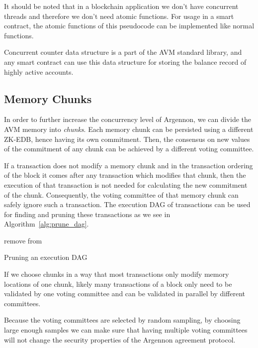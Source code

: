 It should be noted that in a blockchain application we don't have concurrent threads and therefore we don't need
atomic functions. For usage in a smart contract, the atomic functions of this pseudocode can be implemented like
normal functions.

Concurrent counter data structure is a part of the AVM standard library, and any smart contract can use this data
structure for storing the balance record of highly active accounts.

\subsection{Memory Chunks}\label{subsec:memory-chunks}

In order to further increase the concurrency level of Argennon, we can divide the AVM memory into \emph{chunks}.
Each memory chunk can be persisted using a different ZK-EDB, hence having its own commitment. Then, the
consensus on new values of the commitment of any chunk can be achieved by a different voting committee.

If a transaction does not modify a memory chunk and in the transaction ordering of the block it comes after
any transaction which modifies that chunk, then the execution of that transaction is not needed for calculating
the new commitment of the chunk. Consequently, the voting committee of that memory chunk can safely ignore such a
transaction. The execution DAG of transactions can be used for finding and pruning these transactions as
we see in Algorithm~\ref{alg:prune_dag}.

\begin{algorithm}
    \DontPrintSemicolon
    \BlankLine
    {
        \RPrune{\V}\;
    }
    \BlankLine
    \Fn{\RPrune{\V}}
    {
        {
            remove \V from \Graph\;
            {
                \;
            }
        }
    }
    \caption{Pruning an execution DAG}\label{alg:prune_dag}
\end{algorithm}

If we choose chunks in a way that most transactions only modify memory locations of one chunk,
likely many transactions of a block only need to be validated by one voting committee and can be validated in
parallel by different committees.

Because the voting committees are selected by random sampling, by choosing large enough samples we can make sure
that having multiple voting committees will not change the security properties of the Argennon agreement protocol.